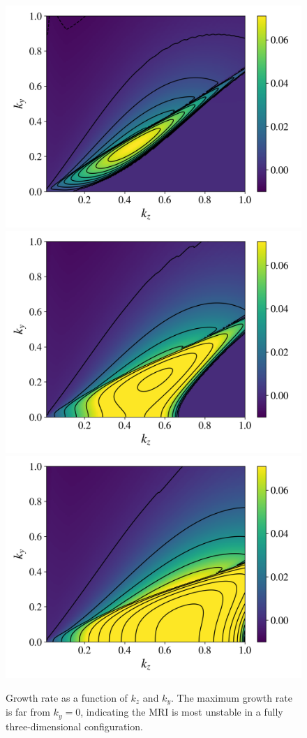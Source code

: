 \documentclass[aps,prl,reprint,groupedaddress]{revtex4-1}
\begin{document}
\begin{figure}[h]
  \includegraphics[width=\columnwidth]{run_11_output_growthrates.png}
  \includegraphics[width=\columnwidth]{run_12_output_growthrates.png}
  \includegraphics[width=\columnwidth]{run_13_output_growthrates.png}
  \caption{Growth rate as a function of $k_z$ and $k_y$. The maximum growth rate is far from $k_y = 0$, indicating the MRI is most unstable in a fully three-dimensional configuration.}
  \label{fig:growth_rate}
\end{figure}
\end{document}
